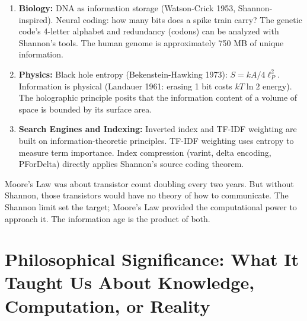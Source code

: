 \begin{enumerate}
\item \textbf{Biology:} DNA as information storage (Watson-Crick 1953, Shannon-inspired). Neural coding: how many bits does a spike train carry? The genetic code's 4-letter alphabet and redundancy (codons) can be analyzed with Shannon's tools. The human genome is approximately 750 MB of unique information.

\item \textbf{Physics:} Black hole entropy (Bekenstein-Hawking 1973): $S = k A/4 \ell_P^2$. Information is physical (Landauer 1961: erasing 1 bit costs $kT \ln 2$ energy). The holographic principle posits that the information content of a volume of space is bounded by its surface area.

\item \textbf{Search Engines and Indexing:} Inverted index and TF-IDF weighting are built on information-theoretic principles. TF-IDF weighting uses entropy to measure term importance. Index compression (varint, delta encoding, PForDelta) directly applies Shannon's source coding theorem.

\end{enumerate}

Moore's Law was about transistor count doubling every two years. But without Shannon, those transistors would have no theory of how to communicate. The Shannon limit set the target; Moore's Law provided the computational power to approach it. The information age is the product of both.

\section{Philosophical Significance: What It Taught Us About Knowledge, Computation, or Reality}
\label{sec:information:philosophy}

